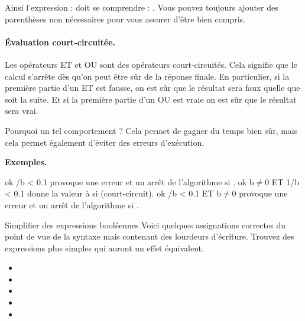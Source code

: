 				Ainsi l'expression : 
				doit se comprendre : .
				Vous pouvez toujours ajouter des parenthèses non nécessaires
				pour vous assurer d'être bien compris.

			\paragraph{Évaluation court-circuitée.}\label{court-circuit}
			
				Les opérateurs ET et OU sont des opérateurs court-circuités.
				Cela signifie que le calcul s'arrête dès qu'on peut être sûr
				de la réponse finale.
				En particulier, si la première partie d'un ET est fausse,
				on est sûr que le résultat sera faux quelle que soit la suite.
				Et si la première partie d'un OU est vraie 
				on est sûr que le résultat sera vrai.
				
				Pourquoi un tel comportement ?
				Cela permet de gagner du temps bien sûr,
				mais cela permet également d'éviter des erreurs d'exécution.
				 
				\textbf{Exemples.}
				\begin{LDA}
					\Let ok /b < 0.1
						\RComment provoque une erreur et un arrêt
						de l'algorithme si . 
					\Let ok \Gets b$\neq$0 ET 1/b < 0.1
						\RComment donne la valeur  à  
						si  (court-circuit). 
					\Let ok /b < 0.1 ET b$\neq$0
						\RComment provoque une erreur et un arrêt
						de l'algorithme si . 
				\end{LDA}
				
			\begin{Exercice}{Simplifier des expressions booléennes}
				Voici quelques assignations correctes du point de vue de la
				syntaxe mais contenant des lourdeurs d’écriture.
				Trouvez des expressions plus simples
				qui auront un effet équivalent.
				\begin{itemize}
					\item {}
					\item {}
					\item {}
					\item {}
					\item {}
				\end{itemize}		
			\end{Exercice}
		
